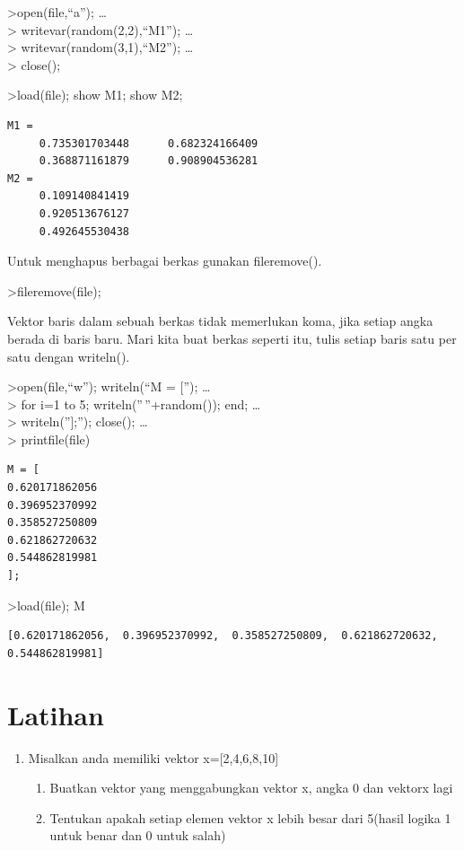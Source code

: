 \documentclass[
]{book}
\begin{document}
\textgreater open(file,``a''); \ldots{}\\
\textgreater{} writevar(random(2,2),``M1''); \ldots{}\\
\textgreater{} writevar(random(3,1),``M2''); \ldots{}\\
\textgreater{} close();

\textgreater load(file); show M1; show M2;

\begin{verbatim}
M1 = 
     0.735301703448      0.682324166409 
     0.368871161879      0.908904536281 
M2 = 
     0.109140841419 
     0.920513676127 
     0.492645530438 
\end{verbatim}

Untuk menghapus berbagai berkas gunakan fileremove().

\textgreater fileremove(file);

Vektor baris dalam sebuah berkas tidak memerlukan koma, jika setiap angka berada di baris baru. Mari kita buat berkas seperti itu, tulis setiap baris satu per satu dengan writeln().

\textgreater open(file,``w''); writeln(``M = {[}''); \ldots{}\\
\textgreater{} for i=1 to 5; writeln(''\,''+random()); end; \ldots{}\\
\textgreater{} writeln(''{]};''); close(); \ldots{}\\
\textgreater{} printfile(file)

\begin{verbatim}
M = [
0.620171862056
0.396952370992
0.358527250809
0.621862720632
0.544862819981
];
\end{verbatim}

\textgreater load(file); M

\begin{verbatim}
[0.620171862056,  0.396952370992,  0.358527250809,  0.621862720632,
0.544862819981]
\end{verbatim}

\section{Latihan}\label{latihan-5}

\begin{enumerate}
\def\labelenumi{\arabic{enumi}.}
\item
  Misalkan anda memiliki vektor x={[}2,4,6,8,10{]}

  \begin{enumerate}
  \def\labelenumii{\alph{enumii}.}
  \item
    Buatkan vektor yang menggabungkan vektor x, angka 0 dan vektorx lagi
  \item
    Tentukan apakah setiap elemen vektor x lebih besar dari 5(hasil logika 1 untuk benar dan 0 untuk salah)
  \end{enumerate}
\end{enumerate}
\end{document}
